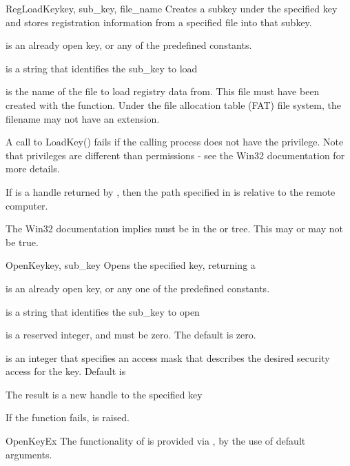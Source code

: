 \begin{funcdesc}{RegLoadKey}{key, sub_key, file_name}
 Creates a subkey under the specified key and stores registration 
 information from a specified file into that subkey.

  is an already open key, or any of the predefined
  constants.
 
  is a string that identifies the sub_key to load
 
  is the name of the file to load registry data from.
  This file must have been created with the  function.
  Under the file allocation table (FAT) file system, the filename may not
  have an extension.

 A call to LoadKey() fails if the calling process does not have the
  privilege. Note that privileges
 are different than permissions - see the Win32 documentation for
 more details.

 If  is a handle returned by , 
 then the path specified in  is relative to the 
 remote computer.

 The Win32 documentation implies  must be in the 
  or  tree.
 This may or may not be true.
\end{funcdesc}


\begin{funcdesc}{OpenKey}{key, sub_key}
  Opens the specified key, returning a 

  is an already open key, or any one of the predefined
  constants.

  is a string that identifies the sub_key to open
 
  is a reserved integer, and must be zero.  The default is zero.
 
  is an integer that specifies an access mask that describes 
 the desired security access for the key.  Default is 
 
 The result is a new handle to the specified key
 
 If the function fails,  is raised.
\end{funcdesc}


\begin{funcdesc}{OpenKeyEx}{}
  The functionality of  is provided via
  , by the use of default arguments.
\end{funcdesc}


